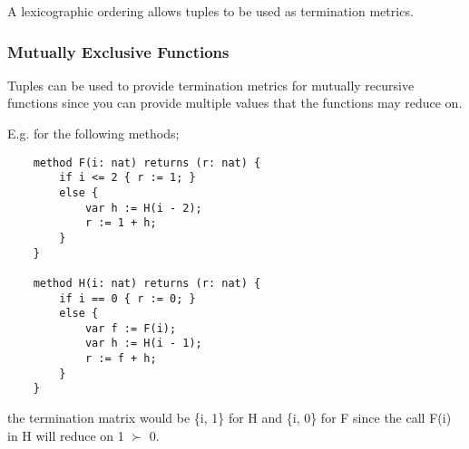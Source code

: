 A lexicographic ordering allows tuples to be used as termination metrics. 

\subsubsection{Mutually Exclusive Functions}
Tuples can be used to provide termination metrics for mutually recursive functions since you can provide multiple values that the functions may reduce on.

E.g. for the following methods;
\begin{verbatim}
    method F(i: nat) returns (r: nat) { 
        if i <= 2 { r := 1; } 
        else {
            var h := H(i - 2);
            r := 1 + h; 
        } 
    } 

    method H(i: nat) returns (r: nat) { 
        if i == 0 { r := 0; } 
        else { 
            var f := F(i); 
            var h := H(i - 1); 
            r := f + h; 
        } 
    }
\end{verbatim}
the termination matrix would be \{i, 1\} for H and \{i, 0\} for F since the call F(i) in H will reduce on 1 $\succ$ 0. 